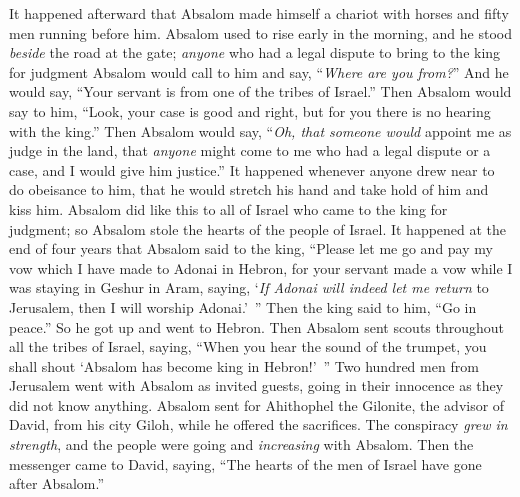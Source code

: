 \begin{biblechapter} %
 It happened afterward that Absalom made himself a chariot with horses and fifty men running before him.
\verse Absalom used to rise early in the morning, and he stood \textit{beside} the road at the gate; \textit{anyone} who had a legal dispute to bring to the king for judgment Absalom would call to him and say, “\textit{Where are you from?}” And he would say, “Your servant is from one of the tribes of Israel.”
\verse Then Absalom would say to him, “Look, your case is good and right, but for you there is no hearing with the king.”
\verse Then Absalom would say, “\textit{Oh, that someone would} appoint me as judge in the land, that \textit{anyone} might come to me who had a legal dispute or a case, and I would give him justice.”
\verse It happened whenever anyone drew near to do obeisance to him, that he would stretch his hand and take hold of him and kiss him.
\verse Absalom did like this to all of Israel who came to the king for judgment; so Absalom stole the hearts of the people of Israel.
\verse It happened at the end of four years that Absalom said to the king, “Please let me go and pay my vow which I have made to Adonai in Hebron,
\verse for your servant made a vow while I was staying in Geshur in Aram, saying, ‘\textit{If Adonai will indeed let me return} to Jerusalem, then I will worship Adonai.’ ”
\verse Then the king said to him, “Go in peace.” So he got up and went to Hebron.
\verse Then Absalom sent scouts throughout all the tribes of Israel, saying, “When you hear the sound of the trumpet, you shall shout ‘Absalom has become king in Hebron!’ ”
\verse Two hundred men from Jerusalem went with Absalom as invited guests, going in their innocence as they did not know anything.
\verse Absalom sent for Ahithophel the Gilonite, the advisor of David, from his city Giloh, while he offered the sacrifices. The conspiracy \textit{grew in strength}, and the people were going and \textit{increasing} with Absalom.
 Then the messenger came to David, saying, “The hearts of the men of Israel have gone after Absalom.”

\end{biblechapter}

